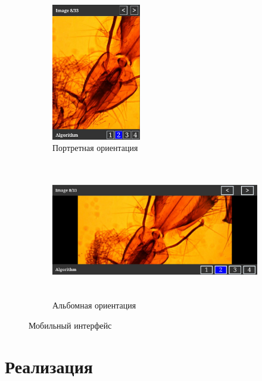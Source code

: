 \documentclass[14pt]{matmex-diploma-custom}
\begin{document}
\begin{figure}[h]
    \begin{subfigure}{.25\textwidth}
        \centering
        \includegraphics[width=.9\linewidth,height=6cm]{figures/comparasion2.png}
        \caption{Портретная ориентация}
        \label{fig:sfig1}
    \end{subfigure}
    \begin{subfigure}{.75\textwidth}
        \centering
        \includegraphics[width=.9\linewidth,height=6cm]{figures/comparasion3.png}
        \caption{Альбомная ориентация}
        \label{fig:sfig2}
    \end{subfigure}
    \caption{Мобильный интерфейс}
    \label{comparation2}
\end{figure}

\section{Реализация}
\end{document}
